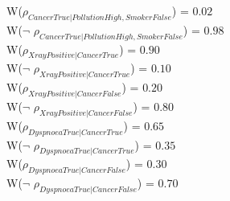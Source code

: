 \documentclass[a4paper,10pt]{report}
\begin{document}
W($\rho_{CancerTrue|PollutionHigh,SmokerFalse}$) = $0.02$\\ 
W($\neg$ $\rho_{CancerTrue|PollutionHigh,SmokerFalse}$) = $0.98$\\ 
W($\rho_{XrayPositive|CancerTrue}$) = $0.90$\\ 
W($\neg$ $\rho_{XrayPositive|CancerTrue}$) = $0.10$\\ 
W($\rho_{XrayPositive|CancerFalse}$) = $0.20$\\ 
W($\neg$ $\rho_{XrayPositive|CancerFalse}$) = $0.80$\\ 
W($\rho_{DyspnoeaTrue|CancerTrue}$) = $0.65$\\ 
W($\neg$ $\rho_{DyspnoeaTrue|CancerTrue}$) = $0.35$\\ 
W($\rho_{DyspnoeaTrue|CancerFalse}$) = $0.30$\\ 
W($\neg$ $\rho_{DyspnoeaTrue|CancerFalse}$) = $0.70$\\ 



\end{document}
